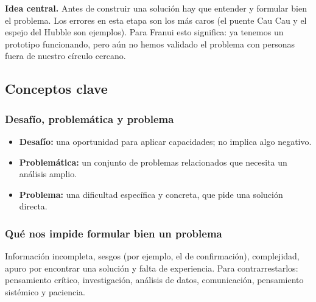 
\begin{idea}
\textbf{Idea central.} Antes de construir una solución hay que entender y formular bien el problema.
Los errores en esta etapa son los más caros (el puente Cau Cau y el espejo del Hubble son ejemplos).
Para Franui esto significa: ya tenemos un prototipo funcionando, pero aún no hemos validado el problema
con personas fuera de nuestro círculo cercano.
\end{idea}

\subsection{Conceptos clave}

\subsubsection{Desafío, problemática y problema}
\begin{itemize}
  \item \textbf{Desafío:} una oportunidad para aplicar capacidades; no implica algo negativo.
  \item \textbf{Problemática:} un conjunto de problemas relacionados que necesita un análisis amplio.
  \item \textbf{Problema:} una dificultad específica y concreta, que pide una solución directa.
\end{itemize}

\subsubsection{Qué nos impide formular bien un problema}
Información incompleta, sesgos (por ejemplo, el de confirmación), complejidad, apuro por encontrar
una solución y falta de experiencia. Para contrarrestarlos: pensamiento crítico, investigación,
análisis de datos, comunicación, pensamiento sistémico y paciencia.

